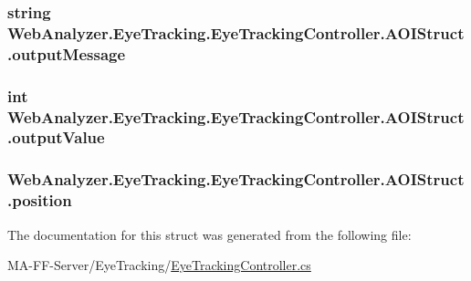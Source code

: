\subsubsection[{output\+Message}]{\setlength{\rightskip}{0pt plus 5cm}string Web\+Analyzer.\+Eye\+Tracking.\+Eye\+Tracking\+Controller.\+A\+O\+I\+Struct.\+output\+Message}\label{struct_web_analyzer_1_1_eye_tracking_1_1_eye_tracking_controller_1_1_a_o_i_struct_a003358361ea7827329f72d55bee09ddc}
\hypertarget{struct_web_analyzer_1_1_eye_tracking_1_1_eye_tracking_controller_1_1_a_o_i_struct_adc29300e5fb7c65d165375c88494bf20}{}
\subsubsection[{output\+Value}]{\setlength{\rightskip}{0pt plus 5cm}int Web\+Analyzer.\+Eye\+Tracking.\+Eye\+Tracking\+Controller.\+A\+O\+I\+Struct.\+output\+Value}\label{struct_web_analyzer_1_1_eye_tracking_1_1_eye_tracking_controller_1_1_a_o_i_struct_adc29300e5fb7c65d165375c88494bf20}
\hypertarget{struct_web_analyzer_1_1_eye_tracking_1_1_eye_tracking_controller_1_1_a_o_i_struct_afb63f84a1078801a841b45ef824b1117}{}
\subsubsection[{position}]{ Web\+Analyzer.\+Eye\+Tracking.\+Eye\+Tracking\+Controller.\+A\+O\+I\+Struct.\+position}\label{struct_web_analyzer_1_1_eye_tracking_1_1_eye_tracking_controller_1_1_a_o_i_struct_afb63f84a1078801a841b45ef824b1117}


The documentation for this struct was generated from the following file\+:\begin{DoxyCompactItemize}
\item 
M\+A-\/\+F\+F-\/\+Server/\+Eye\+Tracking/\hyperlink{_eye_tracking_controller_8cs}{Eye\+Tracking\+Controller.\+cs}\end{DoxyCompactItemize}
